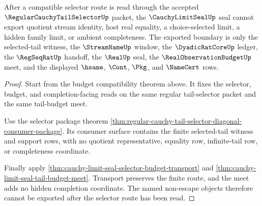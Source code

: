 \begin{theorem}
\label{thm:cauchy-limit-seal-regular-tail-selector-nonescape}
After a compatible selector route is read through the accepted $\RegularCauchyTailSelectorUp$ packet, the $\CauchyLimitSealUp$ seal cannot export quotient stream identity, host real equality, a choice-selected limit, a hidden family limit, or ambient completeness. The exported boundary is only the selected-tail witness, the $\StreamNameUp$ window, the $\DyadicRatCoreUp$ ledger, the $\RegSeqRatUp$ handoff, the $\RealUp$ seal, the $\RealObservationBudgetUp$ meet, and the displayed $\hsame$, $\Cont$, $\Pkg$, and $\NameCert$ rows.
\end{theorem}
\begin{proof}
Start from the budget compatibility theorem above. It fixes the selector, budget, and completion-facing reads on the same regular tail-selector packet and the same tail-budget meet.

Use the selector package theorem \autoref{thm:regular-cauchy-tail-selector-diagonal-consumer-package}. Its consumer surface contains the finite selected-tail witness and support rows, with no quotient representative, equality row, infinite-tail row, or completeness coordinate.

Finally apply \autoref{thm:cauchy-limit-seal-selector-budget-transport} and \autoref{thm:cauchy-limit-seal-tail-budget-meet}. Transport preserves the finite route, and the meet adds no hidden completion coordinate. The named non-escape objects therefore cannot be exported after the selector route has been read.
\end{proof}

